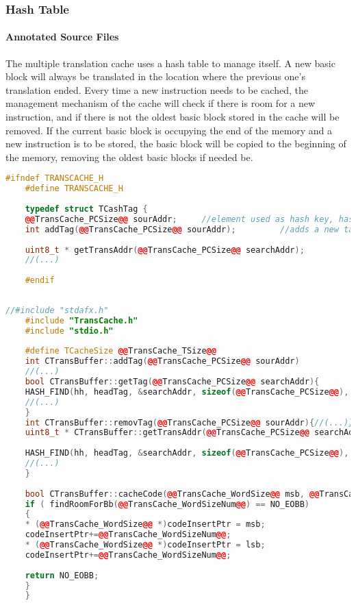\subsubsection{Hash Table}


	\paragraph{Annotated Source Files}
	The multiple translation cache uses a hash table to manage itself. A new basic block will always be translated in the location where the previous one's translation ended. Every time a new instruction needs to be cached, the management mechanism of the cache will check if there is room for a new instruction, and if there is not the oldest basic block stored in the cache will be removed. If the current basic block is occupying the end of the memory and a new instruction is to be stored, the basic block will be copied to the beginning of the memory, removing the oldest basic blocks if needed be.
	\begin{lstlisting}[caption={Annotations for multiple translation TransBuffer.h}, label={lst:annotMultipleTcache.h}, language=C++]
	#ifndef TRANSCACHE_H
	#define TRANSCACHE_H
	
	typedef struct TCashTag {
	@@TransCache_PCSize@@ sourAddr;		//element used as hash key, has the source code memory address of the BB
	int addTag(@@TransCache_PCSize@@ sourAddr);			//adds a new tag entry, marking the begining of a new translated BB
	
	uint8_t * getTransAddr(@@TransCache_PCSize@@ searchAddr);			//return the address of the code or NULL if the entry exists or not
	//(...)
	
	#endif
	
	\end{lstlisting}
	\begin{lstlisting}[caption={Annotations for multiple translation TransBuffer.cpp}, label={lst:annotMultipleTcache.cpp},language=C++]
	//#include "stdafx.h"
	#include "TransCache.h"
	#include "stdio.h"
	
	#define TCacheSize @@TransCache_TSize@@
	int CTransBuffer::addTag(@@TransCache_PCSize@@ sourAddr)
	//(...)
	bool CTransBuffer::getTag(@@TransCache_PCSize@@ searchAddr){
	HASH_FIND(hh, headTag, &searchAddr, sizeof(@@TransCache_PCSize@@), workTag);
	//(...)
	}
	int CTransBuffer::removTag(@@TransCache_PCSize@@ sourAddr){//(...)}
	uint8_t * CTransBuffer::getTransAddr(@@TransCache_PCSize@@ searchAddr){
	
	HASH_FIND(hh, headTag, &searchAddr, sizeof(@@TransCache_PCSize@@), workTag);
	//(...)
	}
	
	bool CTransBuffer::cacheCode(@@TransCache_WordSize@@ msb, @@TransCache_WordSize@@ lsb){
	if ( findRoomForBb(@@TransCache_WordSizeNum@@) == NO_EOBB)
	{
	* (@@TransCache_WordSize@@ *)codeInsertPtr = msb;
	codeInsertPtr+=@@TransCache_WordSizeNum@@;
	* (@@TransCache_WordSize@@ *)codeInsertPtr = lsb;
	codeInsertPtr+=@@TransCache_WordSizeNum@@;
	
	return NO_EOBB;
	}
	}
	
	\end{lstlisting}
